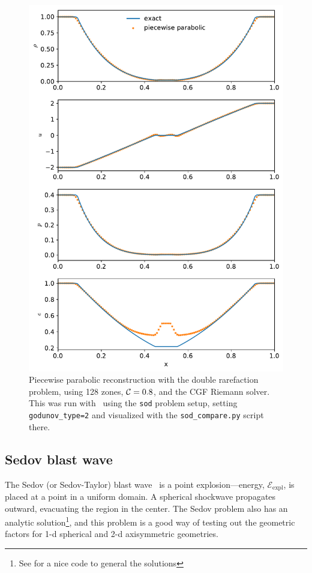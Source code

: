 \begin{figure}[t]
\centering
\includegraphics[width=0.7\linewidth]{hydro1d_ppm_double_rare}
\caption[Piecewise constant reconstruction double rarefaction problem]{\label{fig:Euler:doublerare:ppm} Piecewise parabolic
  reconstruction with the double rarefaction problem, using 128 zones,
  ${\mathcal{C}} = 0.8$, and the CGF Riemann solver.  This was run with
  \hydrooned\ using the {\tt sod} problem setup, setting {\tt
    godunov\_type=2} and visualized with the {\tt sod\_compare.py}
  script there.}
\end{figure}


\subsection{Sedov blast wave}

The Sedov (or Sedov-Taylor) blast wave~\cite{sedov:1959} is a point
explosion---energy, $\mathcal{E}_\mathrm{expl}$, is placed at a point
in a uniform domain.  A spherical shockwave propagates outward,
evacuating the region in the center.  The Sedov problem also has an
analytic solution\footnote{See \cite{timmes_sedov_code} for a nice
  code to general the solutions}, and this problem is a good way of
testing out the geometric factors for 1-d spherical and 2-d
axisymmetric geometries.

